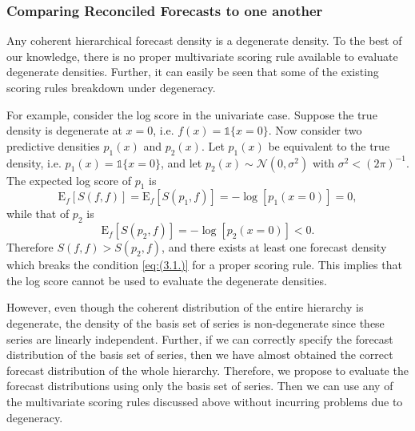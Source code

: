 \documentclass[a4paper, 11pt]{article}
\def\E{\text{E}}
\theoremstyle{theo}
\theoremstyle{definition}
\begin{document}

%

\subsubsection{Comparing Reconciled Forecasts to one another}

Any coherent hierarchical forecast density is a degenerate density. To the best of our knowledge, there is no proper multivariate scoring rule available to evaluate degenerate densities. Further, it can easily be seen that some of the existing scoring rules breakdown under degeneracy. 

For example, consider the log score in the univariate case. Suppose the true density is degenerate at $x=0$, i.e. $f(x)=\mathbb{1}\{x=0\}$.   Now consider two predictive densities $p_1(x)$ and $p_2(x)$. Let $p_1(x)$ be equivalent to the true density, i.e. $p_1(x)=\mathbb{1}\{x=0\}$, and let $p_2(x) \sim \mathcal{N}(0,\sigma^2)$ with $\sigma^2 < (2\pi)^{-1}$. The expected log score of $p_1$ is
$$
\E_f[S(f,f)] = \E_f[S(p_1,f)] = -\log[p_1(x=0)]=0,
$$
while that of $p_2$ is
$$
\E_f[S(p_2,f)] = -\log[p_2(x=0)]<0.
$$
Therefore $S(f,f) > S(p_2,f)$, and there exists at least one forecast density which breaks the condition \eqref{eq:(3.1.)} for a proper scoring rule. This implies that the log score cannot be used to evaluate the degenerate densities.

However, even though the coherent distribution of the entire hierarchy is degenerate, the density of the basis set of series is non-degenerate since these series are linearly independent. Further, if we can correctly specify the forecast distribution of the basis set of series, then we have almost obtained the correct forecast distribution of the whole hierarchy. Therefore, we propose to evaluate the forecast distributions using only the basis set of series. Then we can use any of the multivariate scoring rules discussed above without incurring problems due to degeneracy.
\end{document}

